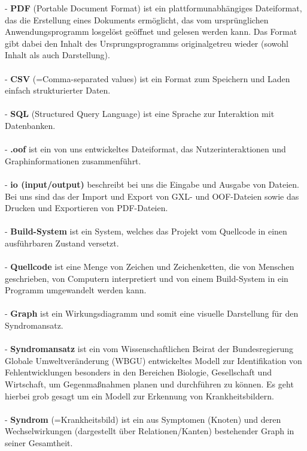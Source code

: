 \documentclass[enabledeprecatedfontcommands,fontsize=11pt,paper=a4,twoside]{scrartcl}
\newcounter{one}
\begin{document}
	- \textbf{PDF} (Portable Document Format) ist ein plattformunabhängiges Dateiformat, das die Erstellung eines Dokuments ermöglicht, das vom ursprünglichen Anwendungsprogramm losgelöst geöffnet und gelesen werden kann. Das Format gibt dabei den Inhalt des Ursprungsprogramms originalgetreu wieder (sowohl Inhalt als auch Darstellung). \\ \\
	- \textbf{CSV} (=Comma-separated values) ist ein Format zum Speichern und Laden einfach strukturierter Daten.\\ \\
	- \textbf{SQL} (Structured Query Language) ist eine Sprache zur Interaktion mit Datenbanken. \\ \\
	- \textbf{.oof} ist ein von uns entwickeltes Dateiformat, das Nutzerinteraktionen und Graphinformationen zusammenführt. \\ \\
	- \textbf{io (input/output)} beschreibt bei uns die Eingabe und Ausgabe von Dateien. Bei uns sind das der Import und Export von GXL- und OOF-Dateien sowie das Drucken und Exportieren von PDF-Dateien. \\ \\
	- \textbf{Build-System} ist ein System, welches das Projekt vom Quellcode in einen ausführbaren Zustand versetzt. \\ \\
	- \textbf{Quellcode} ist eine Menge von Zeichen und Zeichenketten, die von Menschen geschrieben, von Computern interpretiert und von einem Build-System in ein Programm umgewandelt werden kann.  \\ \\
	- \textbf{Graph} ist ein Wirkungsdiagramm und somit eine visuelle Darstellung für den Syndromansatz.  \\ \\
	- \textbf{\hypertarget{Syndromansatz}{Syndromansatz}} ist ein vom \glqq Wissenschaftlichen Beirat der Bundesregierung Globale Umweltveränderung \grqq{} (WBGU) entwickeltes Modell zur Identifikation von Fehlentwicklungen besonders in den Bereichen Biologie, Gesellschaft und Wirtschaft, um Gegenmaßnahmen planen und durchführen zu können. Es geht hierbei grob gesagt um ein Modell zur Erkennung von \glqq Krankheitsbildern\grqq. \\ \\
	- \textbf{Syndrom} (=Krankheitsbild) ist ein aus Symptomen (Knoten) und deren Wechselwirkungen (dargestellt über Relationen/Kanten) bestehender Graph in seiner Gesamtheit. \\ \\
\end{document}
